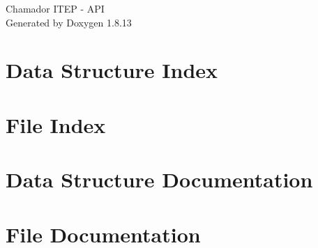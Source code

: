 \documentclass[twoside]{book}
\newcommand{\+}{\discretionary{\mbox{\scriptsize$\hookleftarrow$}}{}{}}
\newcommand{\clearemptydoublepage}{%
  \newpage{\pagestyle{empty}\cleardoublepage}%
}
\begin{document}
\hypersetup{pageanchor=false,
             bookmarksnumbered=true,
             pdfencoding=unicode
            }
\begin{titlepage}
\vspace*{7cm}
\begin{center}%
{\Large Chamador I\+T\+EP -\/ A\+PI }\\
\vspace*{1cm}
{\large Generated by Doxygen 1.8.13}\\
\end{center}
\end{titlepage}
\clearemptydoublepage
{}
\tableofcontents
\clearemptydoublepage
{}
\hypersetup{pageanchor=true}

\chapter{Data Structure Index}

\chapter{File Index}

\chapter{Data Structure Documentation}







\chapter{File Documentation}












































\backmatter
\newpage
{}
\clearemptydoublepage
{}
\printindex
\end{document}
